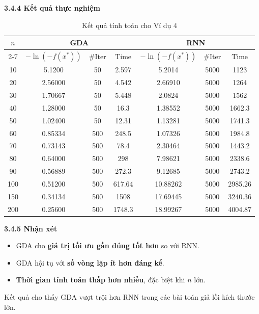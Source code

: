 \begin{frame}{\textbf{\large 3.4.4 Kết quả thực nghiệm}}
\vspace*{-1cm}
\scriptsize
\begin{table}
\centering
\begin{tabular}{|c|c|c|c|c|c|c|}
\hline
$n$ & \multicolumn{3}{c|}{GDA} & \multicolumn{3}{c|}{RNN} \\ \cline{2-7}
 & $-\ln(-f(x^*))$ & \#Iter & Time
 & $-\ln(-f(x^*))$ & \#Iter & Time \\
\hline
10  & 5.1200  & 50 & 2.597 & 5.2014  & 5000 & 1123  \\ \hline
20  & 2.56000  & 50 & 4.542 & 2.66910  & 5000 & 1264  \\ \hline
30  &  1.70667 & 50 & 5.448 & 2.0824  & 5000 & 1562  \\ \hline
40  & 1.28000  & 50 & 16.3 & 1.38552  & 5000 & 1662.3  \\ \hline
50  & 1.02400  & 50 & 12.31 & 1.13281  & 5000 & 1741.3  \\ \hline
60  & 0.85334  & 500 & 248.5 & 1.07326  & 5000 & 1984.8  \\ \hline
70  &  0.73143  & 500 & 78.4 & 2.30464  & 5000 & 1443.2  \\ \hline
80  &  0.64000  & 500 & 298 & 7.98621  & 5000 & 2338.6  \\ \hline
90  &  0.56889  & 500 & 272.3  & 9.12685  & 5000 & 2743.2  \\ \hline
100 & 0.51200  & 500 & 617.64   & 10.88262 & 5000 &2985.26  \\ \hline
150 &  0.34134  & 500 & 1508   & 17.69445 & 5000 & 3240.36 \\ \hline
200 & 0.25600  & 500 & 1748.3   & 18.99267  & 5000 & 4004.87  \\ \hline
\end{tabular}
\caption{Kết quả tính toán cho Ví dụ 4}
\end{table}
\end{frame}

\begin{frame}{\textbf{\large 3.4.5 Nhận xét}}
\vspace*{-1cm}
\begin{itemize}
\item GDA cho \textbf{giá trị tối ưu gần đúng tốt hơn} so với RNN.
\item GDA hội tụ với \textbf{số vòng lặp ít hơn đáng kể}.
\item \textbf{Thời gian tính toán thấp hơn nhiều}, đặc biệt khi $n$ lớn.
\end{itemize}

Kết quả cho thấy GDA vượt trội hơn RNN trong các bài toán giả lồi
kích thước lớn.
\end{frame}